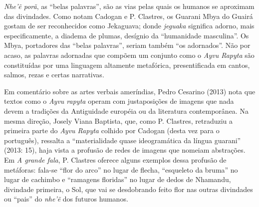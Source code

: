 \emph{Nhe'ẽ porã}, as ``belas palavras'', são as vias pelas quais os
humanos se aproximam das divindades. Como notam Cadogan e P. Clastres,
os Guarani Mbya do Guairá gostam de ser reconhecidos como Jekaguava;
donde \emph{jeguaka} significa adorno, mais especificamente, a diadema
de plumas, desígnio da ``humanidade masculina''. Os Mbya, portadores das
``belas palavras'', seriam também ``os adornados''. Não por acaso, as
palavras adornadas que compõem um conjunto como o \emph{Ayvu Rapyta} são
constituídas por uma linguagem altamente metafórica, presentificada em
cantos, salmos, rezas e certas narrativas.

Em comentário sobre as artes verbais ameríndias, Pedro Cesarino (2013)
nota que textos como o \emph{Ayvu rapyta} operam com justaposições de
imagens que nada devem a tradições da Antiguidade européia ou da
literatura contemporânea. Na mesma direção, Josely Viana Baptista, que,
como P. Clastres, retraduziu a primeira parte do \emph{Ayvu Rapyta}
colhido por Cadogan (desta vez para o português), ressalta a
``materialidade quase ideogramática da língua guarani'' (2013: 15), haja
vista a profusão de redes de imagens que nomeiam abstrações. Em \emph{A
grande fala}, P. Clastres oferece alguns exemplos dessa profusão de
metáforas: fala-se ``flor do arco'' no lugar de flecha, ``esqueleto da
bruma'' no lugar de cachimbo e ``ramagens floridas'' no lugar de dedos
de Nhamandu, divindade primeira, o Sol, que vai se desdobrando feito
flor nas outras divindades ou ``pais'' do \emph{nhe'ẽ} dos futuros
humanos.

